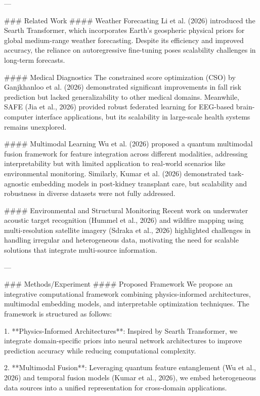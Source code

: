 ---

### Related Work  
#### Weather Forecasting  
Li et al. (2026) introduced the Searth Transformer, which incorporates Earth's geospheric physical priors for global medium-range weather forecasting. Despite its efficiency and improved accuracy, the reliance on autoregressive fine-tuning poses scalability challenges in long-term forecasts.  

#### Medical Diagnostics  
The constrained score optimization (CSO) by Ganjkhanloo et al. (2026) demonstrated significant improvements in fall risk prediction but lacked generalizability to other medical domains. Meanwhile, SAFE (Jia et al., 2026) provided robust federated learning for EEG-based brain-computer interface applications, but its scalability in large-scale health systems remains unexplored.  

#### Multimodal Learning  
Wu et al. (2026) proposed a quantum multimodal fusion framework for feature integration across different modalities, addressing interpretability but with limited application to real-world scenarios like environmental monitoring. Similarly, Kumar et al. (2026) demonstrated task-agnostic embedding models in post-kidney transplant care, but scalability and robustness in diverse datasets were not fully addressed.  

#### Environmental and Structural Monitoring  
Recent work on underwater acoustic target recognition (Hummel et al., 2026) and wildfire mapping using multi-resolution satellite imagery (Sdraka et al., 2026) highlighted challenges in handling irregular and heterogeneous data, motivating the need for scalable solutions that integrate multi-source information.  

---

### Methods/Experiment  
#### Proposed Framework  
We propose an integrative computational framework combining physics-informed architectures, multimodal embedding models, and interpretable optimization techniques. The framework is structured as follows:  

1. **Physics-Informed Architectures**: Inspired by Searth Transformer, we integrate domain-specific priors into neural network architectures to improve prediction accuracy while reducing computational complexity.  

2. **Multimodal Fusion**: Leveraging quantum feature entanglement (Wu et al., 2026) and temporal fusion models (Kumar et al., 2026), we embed heterogeneous data sources into a unified representation for cross-domain applications.  

